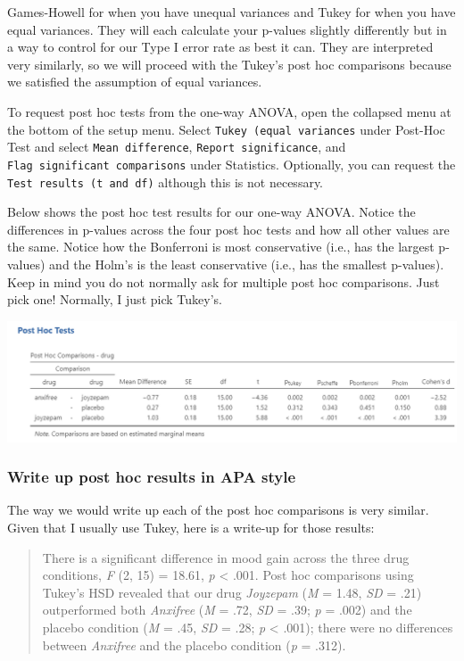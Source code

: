\documentclass[
]{book}
\begin{document}
Games-Howell for when you have unequal variances and Tukey for when you have equal variances. They will each calculate your p-values slightly differently but in a way to control for our Type I error rate as best it can. They are interpreted very similarly, so we will proceed with the Tukey's post hoc comparisons because we satisfied the assumption of equal variances.

To request post hoc tests from the one-way ANOVA, open the collapsed menu at the bottom of the setup menu. Select \texttt{Tukey\ (equal\ variances} under Post-Hoc Test and select \texttt{Mean\ difference}, \texttt{Report\ significance}, and \texttt{Flag\ significant\ comparisons} under Statistics. Optionally, you can request the \texttt{Test\ results\ (t\ and\ df)} although this is not necessary.

Below shows the post hoc test results for our one-way ANOVA. Notice the differences in p-values across the four post hoc tests and how all other values are the same. Notice how the Bonferroni is most conservative (i.e., has the largest p-values) and the Holm's is the least conservative (i.e., has the smallest p-values). Keep in mind you do not normally ask for multiple post hoc comparisons. Just pick one! Normally, I just pick Tukey's.

\includegraphics{images/04_one-way-anova/one-way_results_post-hoc.png}

\hypertarget{write-up-post-hoc-results-in-apa-style}{%
\subsubsection{Write up post hoc results in APA style}\label{write-up-post-hoc-results-in-apa-style}}

The way we would write up each of the post hoc comparisons is very similar. Given that I usually use Tukey, here is a write-up for those results:

\begin{quote}
There is a significant difference in mood gain across the three drug conditions, \emph{F} (2, 15) = 18.61, \emph{p} \textless{} .001. Post hoc comparisons using Tukey's HSD revealed that our drug \emph{Joyzepam} (\emph{M} = 1.48, \emph{SD} = .21) outperformed both \emph{Anxifree} (\emph{M} = .72, \emph{SD} = .39; \emph{p} = .002) and the placebo condition (\emph{M} = .45, \emph{SD} = .28; \emph{p} \textless{} .001); there were no differences between \emph{Anxifree} and the placebo condition (\emph{p} = .312).
\end{quote}
\end{document}
